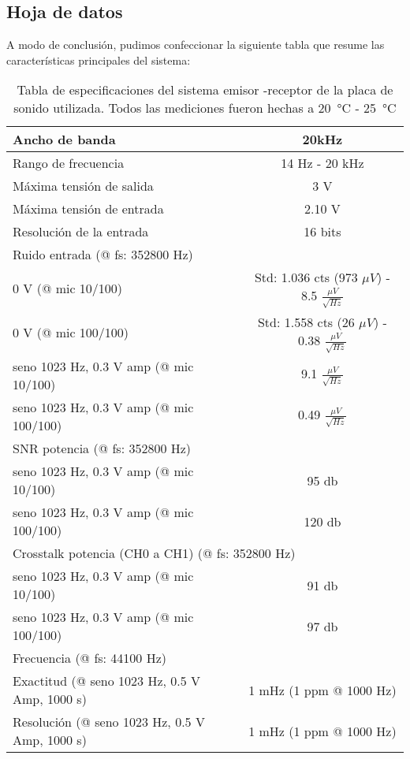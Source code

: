 \documentclass[a4paper, 11pt]{article}
\begin{document}
\subsection*{Hoja de datos}
A modo de conclusión, pudimos confeccionar la siguiente tabla que resume las características principales del sistema:
\begin {table}[H]
\begin {center}
 \begin{tabular} {|l|c|}
        \hline
        Ancho de banda & 20kHz \\
        \hline
        Rango de frecuencia & 14 Hz - 20 kHz\\
        \hline
        Máxima tensión de salida  & 3 V\\
        \hline
        Máxima tensión de entrada  & 2.10 V\\
        \hline
        Resolución de la entrada  & 16 bits\\
        \hline
	\multicolumn{2}{|l|}{Ruido entrada (@ fs: 352800 Hz)} \tabularnewline
        \hline
        0 V (@ mic 10/100) & Std: 1.036 cts (973 $\mu V$)  - 8.5 $ \frac{\mu V}{\sqrt{Hz}}$ \\
        0 V (@ mic 100/100) & Std: 1.558 cts (26 $\mu V$) - 0.38 $ \frac{\mu V}{\sqrt{Hz}}$ \\
        \hline
         seno 1023 Hz, 0.3 V amp (@ mic 10/100) & 9.1 $ \frac{\mu V}{\sqrt{Hz}}$\\
	seno 1023 Hz, 0.3 V amp (@ mic 100/100) & 0.49 $ \frac{\mu V}{\sqrt{Hz}}$\\
        \hline
	\multicolumn{2}{|l|}{SNR potencia (@ fs: 352800 Hz)} \tabularnewline
        \hline
         seno 1023 Hz, 0.3 V amp (@ mic 10/100) & 95 db \\
	seno 1023 Hz, 0.3 V amp (@ mic 100/100) & 120 db \\
	\hline
	\multicolumn{2}{|l|}{Crosstalk potencia (CH0 a CH1) (@ fs: 352800 Hz)} \tabularnewline
	\hline
        seno 1023 Hz, 0.3 V amp (@ mic 10/100) & 91 db \\
	seno 1023 Hz, 0.3 V amp (@ mic 100/100) & 97 db \\
        \hline
\multicolumn{2}{|l|}{Frecuencia (@ fs: 44100 Hz) } \tabularnewline
        \hline
	Exactitud (@ seno 1023 Hz, 0.5 V Amp, 1000 s)  & 1 mHz (1 ppm @ 1000 Hz) \\
	Resolución (@ seno 1023 Hz, 0.5 V Amp, 1000 s) & 1 mHz (1 ppm @ 1000 Hz) \\
        \hline
 \end{tabular}
 \caption{Tabla de especificaciones del sistema emisor -receptor de la placa de sonido utilizada. Todos las mediciones fueron hechas a \SI{20}{\celsius} - \SI{25}{\celsius}}
 \label{table1}
 \end{center}
\end{table}
\end{document}
